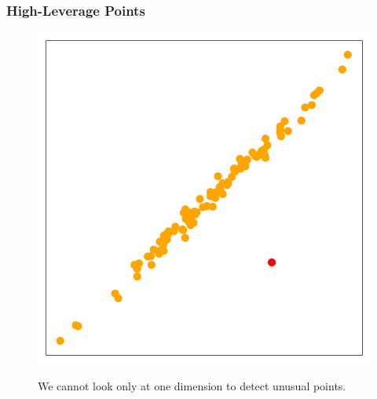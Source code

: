 \documentclass[serif, xcolor={dvipsnames}]{beamer} %
\begin{document}
\begin{frame}
\frametitle{High-Leverage Points}
\vspace{-.18in}
\begin{figure}[htbp]
\hspace{-.2in}
    \begin{minipage}{0.4\textwidth}
        \includegraphics[width=\linewidth]{high_leverage_point}
    \end{minipage}%
    \hspace{.2in}
    \begin{minipage}{0.5\textwidth}
       We cannot look only at one dimension to detect unusual points.
    \end{minipage}
\end{figure}

\end{frame}
\end{document}
